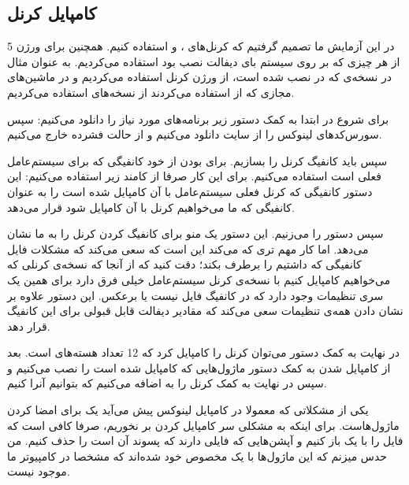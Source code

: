 \subsection{کامپایل کرنل}
در این آزمایش ما تصمیم گرفتیم که کرنل‌های
،  و 
استفاده کنیم. همچنین برای ورژن 5 از هر چیزی که بر روی سیستم بای دیفالت نصب بود استفاده می‌کردیم.
به عنوان مثال در نسخه‌ی
که در
نصب شده است، از ورژن کرنل
استفاده می‌کردیم و در ماشین‌های مجازی که از
استفاده می‌کردند از نسخه‌های
استفاده می‌کردیم.

برای شروع در ابتدا به کمک دستور زیر برنامه‌های مورد نیاز را دانلود می‌کنیم:
سپس سورس‌کد‌های لینوکس را از سایت
دانلود می‌کنیم و از حالت فشرده خارج می‌کنیم.

سپس باید کانفیگ کرنل را بسازیم. برای
بودن از خود کانفیگی که برای سیستم‌عامل فعلی است استفاده می‌کنیم. برای این کار صرفا از کامند زیر
استفاده می‌کنیم:
این دستور کانفیگی که کرنل فعلی سیستم‌عامل با آن کامپایل شده است را به عنوان کانفیگی که ما می‌خواهیم
کرنل با آن کامپایل شود قرار می‌دهد.

سپس دستور
را می‌زنیم. این دستور یک منو برای کانفیگ کردن کرنل را به ما نشان می‌دهد. اما کار مهم تری که می‌کند این است که
سعی می‌کند که مشکلات فایل کانفیگی که داشتیم را برطرف بکند؛ دقت کنید که از آنجا که نسخه‌ی کرنلی که می‌خواهیم
کامپایل کنیم با نسخه‌ی کرنل سیستم‌عامل خیلی فرق دارد برای همین یک سری تنظیمات وجود دارد که در کانفیگ فایل نیست
یا برعکس. این دستور علاوه بر نشان دادن همه‌ی تنظیمات سعی می‌کند که مقادیر دیفالت قابل قبولی برای
این کانفیگ قرار دهد.

در نهایت به کمک دستور
می‌توان کرنل را کامپایل کرد که 12 تعداد هسته‌های
است. بعد از کامپایل شدن به کمک دستور
ماژول‌هایی که کامپایل شده است را نصب می‌کنیم و سپس در نهایت به کمک
کرنل را به
اضافه می‌کنیم که بتوانیم آنرا
کنیم.

یکی از مشکلاتی که معمولا در کامپایل لینوکس پیش می‌آید یک
برای امضا کردن ماژول‌هاست. برای اینکه به مشکلی سر کامپایل کردن بر نخوریم، صرفا کافی است که فایل
را با یک
باز کنیم و آپشن‌هایی که فایلی دارند که پسوند آن
است را حذف کنیم. من حدس میزنم که این ماژول‌ها با یک
مخصوص خود
شده‌اند که مشخصا در کامپیوتر ما موجود نیست.

